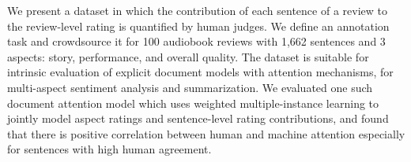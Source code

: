 We present a dataset in which the contribution of each sentence of a review to the review-level rating is quantified by human judges. We define an annotation task and crowdsource it for 100 audiobook reviews with 1,662 sentences and 3 aspects: story, performance, and overall quality. The dataset is suitable for intrinsic evaluation of explicit document models with attention mechanisms, for multi-aspect sentiment analysis and summarization. We evaluated one such document attention model which uses weighted multiple-instance learning to jointly model aspect ratings and sentence-level rating contributions, and found that there is positive correlation between human and machine attention especially for sentences with high human agreement.
